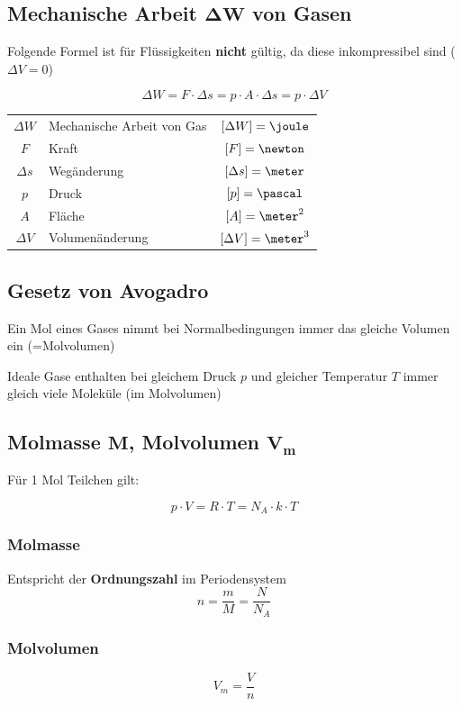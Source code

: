 \subsection[Mechanische Arbeit von Gasen]{Mechanische Arbeit $\bm{\Delta W}$ von Gasen}
\label{MechArbeit}

Folgende Formel ist für Flüssigkeiten \textbf{nicht} gültig, da diese inkompressibel sind ($\Delta V = 0$)

$$ \boxed{ \Delta W = F \cdot \Delta s = p \cdot A \cdot \Delta s = p \cdot \Delta V } $$


\begin{tabular}{c l c}
	$\Delta W$ 	& Mechanische Arbeit von Gas	& $[\Delta W] = \joule$		\\
	$F$ 		& Kraft 						& $[F] = \newton$ 			\\
	$\Delta s$ 	& Wegänderung 					& $[\Delta s] = \meter$ 	\\
	$p$ 		& Druck 						& $[p] = \pascal$ 			\\
	$A$ 		& Fläche 						& $[A] = \meter^2$ 			\\
	$\Delta V$ 	& Volumenänderung 				& $[\Delta V] = \meter^3$
\end{tabular}


\subsection{Gesetz von Avogadro}

Ein Mol eines Gases nimmt bei Normalbedingungen immer das gleiche Volumen ein (=Molvolumen) 

Ideale Gase enthalten bei gleichem Druck $p$ und gleicher Temperatur $T$ immer gleich viele Moleküle (im Molvolumen)

\subsection[Molmasse / Molvolumen]{Molmasse $\bm{M}$, Molvolumen $\bm{V_m}$}

Für 1 Mol Teilchen gilt: 

$$ \boxed{ p \cdot V = R \cdot T = N_A \cdot k \cdot T } $$

\medskip

\begin{minipage}[t]{0.58\columnwidth}
	\subsubsection{Molmasse}

	Entspricht der \textbf{Ordnungszahl} im Periodensystem
	$$  \boxed{ n = \frac{m}{M} = \frac{N}{N_A} } $$
\end{minipage}
\hfill
\begin{minipage}[t]{0.38\columnwidth}
	\subsubsection{Molvolumen}
	
	\phantom{eifach öppis}
	$$ \boxed{ V_m = \frac{V}{n} }$$
\end{minipage}


